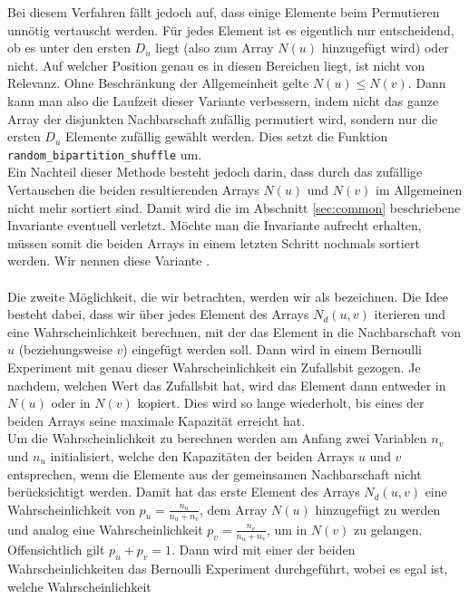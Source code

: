 Bei diesem Verfahren fällt  jedoch auf, dass einige Elemente beim Permutieren unnötig vertauscht werden.
Für jedes Element ist es eigentlich nur entscheidend, ob es unter den ersten $D_{u}$  liegt (also zum Array
$N(u)$ hinzugefügt wird) oder nicht. Auf welcher Position genau es in 
diesen Bereichen liegt, ist nicht von Relevanz. Ohne Beschränkung der Allgemeinheit gelte 
$N(u) \le N(v)$. Dann kann man
also die Laufzeit dieser Variante verbessern, indem nicht das ganze Array der disjunkten Nachbarschaft zufällig permutiert 
wird, sondern nur die ersten $D_{u}$  Elemente zufällig gewählt werden.
 Dies setzt die Funktion 
\texttt{random\_bipartition\_shuffle} um.
\\
Ein Nachteil dieser Methode besteht jedoch darin, dass durch das zufällige Vertauschen die beiden resultierenden Arrays
$N(u)$ und $N(v)$ im Allgemeinen nicht mehr sortiert sind. Damit wird die im Abschnitt \ref{sec:common} beschriebene
Invariante eventuell verletzt. Möchte man die Invariante aufrecht erhalten, müssen somit die beiden Arrays
in einem letzten Schritt nochmals sortiert werden.
Wir nennen diese Variante \perm.
\\
\\
Die zweite Möglichkeit, die wir betrachten, werden wir als \distr{} bezeichnen.
Die Idee besteht dabei, dass wir über jedes Element des Arrays $N_{d}(u,v)$ iterieren und eine Wahrscheinlichkeit
berechnen, mit
der das Element in die Nachbarschaft von $u$ (beziehungsweise $v$) eingefügt werden soll. Dann wird in einem 
Bernoulli Experiment mit genau dieser Wahrscheinlichkeit ein Zufallsbit gezogen. Je nachdem, welchen
Wert das Zufallsbit hat, wird das Element dann entweder in $N(u)$ oder in $N(v)$ kopiert. Dies wird so lange
wiederholt, bis eines der beiden Arrays seine maximale Kapazität erreicht hat. 
\\
Um die Wahrscheinlichkeit zu berechnen werden am Anfang zwei Variablen $n_v$ und $n_u$ initialisiert, 
welche den Kapazitäten der beiden Arrays $u$ und $v$ entsprechen, wenn die Elemente aus der 
gemeinsamen Nachbarschaft nicht berücksichtigt werden. 
Damit hat das erste Element des Arrays $N_{d}(u,v)$ eine Wahrscheinlichkeit von $p_u = \frac{n_u}{n_u+n_v}$, dem
Array $N(u)$ hinzugefügt zu werden und analog eine Wahrscheinlichkeit $p_v = \frac{n_v}{n_u+n_v}$, um
in $N(v)$ zu gelangen. Offensichtlich gilt $p_u + p_v = 1$. Dann wird mit einer der beiden
Wahrscheinlichkeiten das Bernoulli Experiment durchgeführt, wobei es egal ist, welche Wahrscheinlichkeit
